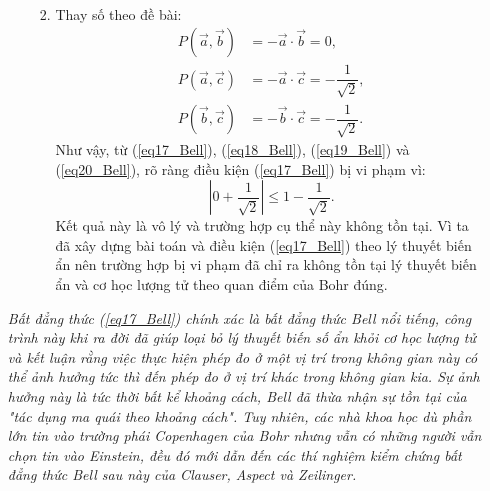 \begin{enumerate}
\begin{enumerate}[label=\textbf{\alph*,}]
\begin{enumerate}
\begin{align}
\end{align}
      \item Thay số theo đề bài:
\begin{align}
    \label{eq18_Bell}
    P(\Vec{a},\Vec{b})&=-\Vec{a}\cdot \Vec{b}=0,\\
    \label{eq19_Bell}
    P(\Vec{a},\Vec{c})&=-\Vec{a}\cdot \Vec{c}=-\dfrac{1}{\sqrt{2}},\\
    \label{eq20_Bell}
    P(\Vec{b},\Vec{c})&=-\Vec{b}\cdot \Vec{c}=-\dfrac{1}{\sqrt{2}}.
\end{align}
Như vậy, từ (\ref{eq17_Bell}), (\ref{eq18_Bell}), (\ref{eq19_Bell}) và (\ref{eq20_Bell}), rõ ràng điều kiện (\ref{eq17_Bell}) bị vi phạm vì: 
$$\left|0+\dfrac{1}{\sqrt{2}}\right| \leq 1-\dfrac{1}{\sqrt{2}}.$$
Kết quả này là vô lý và trường hợp cụ thể này không tồn tại. Vì ta đã xây dựng bài toán và điều kiện (\ref{eq17_Bell}) theo lý thuyết biến ẩn nên trường hợp bị vi phạm đã chỉ ra không tồn tại lý thuyết biến ẩn và cơ học lượng tử theo quan điểm của Bohr đúng.
    \end{enumerate}
    \end{enumerate}
\textit{Bất đẳng thức (\ref{eq17_Bell}) chính xác là bất đẳng thức Bell nổi tiếng, công trình này khi ra đời đã giúp loại bỏ lý thuyết biến số ẩn khỏi cơ học lượng tử và kết luận rằng việc thực hiện phép đo ở một vị trí trong không gian này có thể ảnh hưởng tức thì đến phép đo ở vị trí khác trong không gian kia. Sự ảnh hưởng này là tức thời bất kể khoảng cách, Bell đã thừa nhận sự tồn tại của "tác dụng ma quái theo khoảng cách". Tuy nhiên, các nhà khoa học dù phần lớn tin vào trường phái Copenhagen của Bohr nhưng vẫn có những người vẫn chọn tin vào Einstein, đều đó mới dẫn đến các thí nghiệm kiểm chứng bất đẳng thức Bell sau này của Clauser, Aspect và Zeilinger.}


\end{enumerate}
